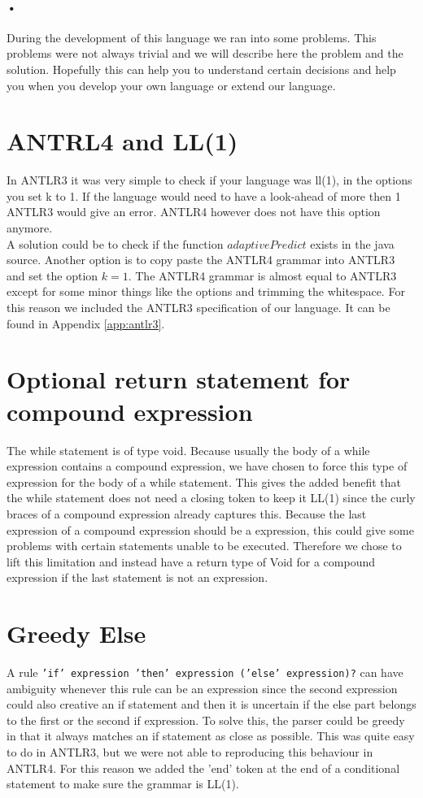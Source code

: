 \paragraph{•}
During the development of this language we ran into some problems. This problems were not always trivial and we will describe here the problem and the solution. Hopefully this can help you to understand certain decisions and help you when you develop your own language or extend our language.
\section{ANTRL4 and LL(1)}
In ANTLR3 it was very simple to check if your language was ll(1), in the options you set k to 1. If the language would need to have a look-ahead of more then 1 ANTLR3 would give an error. ANTLR4 however does not have this option anymore. \\
A solution could be to check if the function $adaptivePredict$ exists in the java source. Another option is to copy paste the ANTLR4 grammar into ANTLR3 and set the option $k=1$. The ANTLR4 grammar is almost equal to ANTLR3 except for some minor things like the options and trimming the whitespace. For this reason we included the ANTLR3 specification of our language. It can be found in Appendix \ref{app:antlr3}.

\section{Optional return statement for compound expression}
The while statement is of type void. Because usually the body of a while expression contains a compound expression, we have chosen to force this type of expression for the body of a while statement. This gives the added benefit that the while statement does not need a closing token to keep it LL(1) since the curly braces of a compound expression already captures this. Because the last expression of a compound expression should be a expression, this could give some problems with certain statements unable to be executed. Therefore we chose to lift this limitation and instead have a return type of Void for a compound expression if the last statement is not an expression.

\section{Greedy Else}
A rule \texttt{'if' expression 'then' expression ('else' expression)?} can have ambiguity whenever this rule can be an expression since the second expression could also creative an if statement and then it is uncertain if the else part belongs to the first or the second if expression. To solve this, the parser could be greedy in that it always matches an if statement as close as possible. This was quite easy to do in ANTLR3, but we were not able to reproducing this behaviour in ANTLR4. For this reason we added the 'end' token at the end of a conditional statement to make sure the grammar is LL(1).